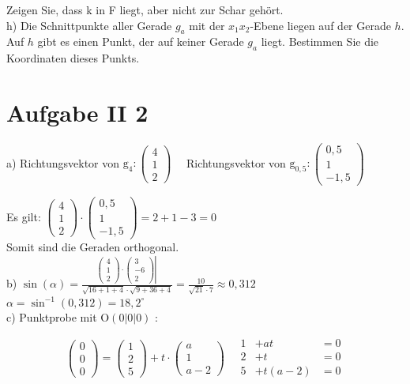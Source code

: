 \documentclass[10pt]{article}
\begin{document}
Zeigen Sie, dass k in F liegt, aber nicht zur Schar gehört.\\
h) Die Schnittpunkte aller Gerade $g_{a}$ mit der $x_{1} x_{2}$-Ebene liegen auf der Gerade $h$. Auf $h$ gibt es einen Punkt, der auf keiner Gerade $g_{a}$ liegt. Bestimmen Sie die Koordinaten dieses Punkts.

\section*{Aufgabe II 2}
a) Richtungsvektor von $\mathrm{g}_{4}:\left(\begin{array}{l}4 \\ 1 \\ 2\end{array}\right) \quad$ Richtungsvektor von $\mathrm{g}_{0,5}:\left(\begin{array}{c}0,5 \\ 1 \\ -1,5\end{array}\right)$

Es gilt: $\left(\begin{array}{l}4 \\ 1 \\ 2\end{array}\right) \cdot\left(\begin{array}{c}0,5 \\ 1 \\ -1,5\end{array}\right)=2+1-3=0$\\
Somit sind die Geraden orthogonal.\\
b) $\sin (\alpha)=\frac{\left.\left(\begin{array}{l}4 \\ 1 \\ 2\end{array}\right) \cdot\left(\begin{array}{c}3 \\ -6 \\ 2\end{array}\right) \right\rvert\,}{\sqrt{16+1+4} \cdot \sqrt{9+36+4}}=\frac{10}{\sqrt{21} \cdot 7} \approx 0,312$\\
$\alpha=\sin ^{-1}(0,312)=18,2^{\circ}$\\
c) Punktprobe mit $\mathrm{O}(0|0| 0)$ :

$$
\left(\begin{array}{l}
0 \\
0 \\
0
\end{array}\right)=\left(\begin{array}{l}
1 \\
2 \\
5
\end{array}\right)+t \cdot\left(\begin{array}{c}
a \\
1 \\
a-2
\end{array}\right) \quad \begin{array}{ccc}
1 & +a t & =0 \\
2 & +t & =0 \\
5 & +t(a-2) & =0
\end{array}
$$
\end{document}

